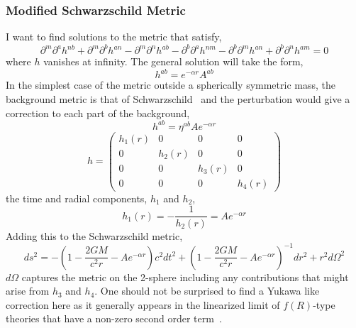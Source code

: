 \documentclass[aps,prd,preprint]{revtex4-1}
\begin{document}
\subsubsection*{Modified Schwarzschild Metric}
I want to find solutions to the metric that satisfy,
\begin{equation}\label{h_wave_equation}
    \partial^m\partial^{a}h^{nb} + \partial^m\partial^{b}h^{an} - \partial^m\partial^{n}h^{ab} - \partial^b\partial^{a}h^{nm} - \partial^b\partial^{m}h^{an} + \partial^b\partial^{n}h^{am} = 0
\end{equation}
where $h$ vanishes at infinity. The general solution will take the form,
\begin{equation}\label{h_wave_solution}
    h^{ab} = e^{-\alpha r}A^{ab}
\end{equation}
In the simplest case of the metric outside a spherically symmetric mass, the background metric is that of Schwarzschild~\cite{kruskal_1960} and the perturbation would give a correction to each part of the background,
\begin{equation}\label{corrections_to_Schwarzschild}
    h^{ab} = \eta^{ab}Ae^{-\alpha r}
\end{equation}
\begin{equation}
    h = \begin{pmatrix}
        h_{1}(r) & 0 & 0 & 0 \\
        0 & h_{2}(r) & 0 & 0 \\
        0 & 0 & h_{3}(r) & 0 \\
        0 & 0 & 0 & h_{4}(r)
    \end{pmatrix}
\end{equation}
the time and radial components, $h_{1}$ and $h_{2}$,
\begin{equation}
    h_{1}(r) = - \frac{1}{h_{2}(r)} = Ae^{-\alpha r}
\end{equation}
Adding this to the Schwarzschild metric,
\begin{equation}
    ds^2 = -\left( 1 - \frac{2GM}{c^2r} - Ae^{-\alpha r} \right) c^2 dt^2 + \left( 1 - \frac{2GM}{c^2r} - Ae^{-\alpha r} \right)^{-1} dr^2 + r^2 d\Omega^2
\end{equation}
$d\Omega$ captures the metric on the 2-sphere including any contributions that might arise from $h_{3}$ and $h_{4}$. One should not be surprised to find a Yukawa like correction here as it generally appears in the linearized limit of $f(R)$-type theories that have a non-zero second order term~\cite{capozziello_2009,stabile_2013,liu_2017,capozziello_2020,hurtado_2025}.
\\
\end{document}
